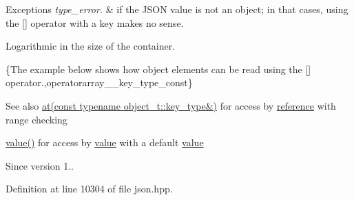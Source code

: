 \begin{DoxyExceptions}{Exceptions}
{\em type\+\_\+error.} & if the J\+S\+ON value is not an object; in that cases, using the \mbox{[}\mbox{]} operator with a key makes no sense.\\
\hline
\end{DoxyExceptions}
Logarithmic in the size of the container.

\{The example below shows how object elements can be read using the {\ttfamily \mbox{[}\mbox{]}} operator.,operatorarray\+\_\+\+\_\+key\+\_\+type\+\_\+const\}

\begin{DoxySeeAlso}{See also}
\hyperlink{classnlohmann_1_1basic__json_a93403e803947b86f4da2d1fb3345cf2c}{at(const typename object\+\_\+t\+::key\+\_\+type\&)} for access by \hyperlink{classnlohmann_1_1basic__json_ac6a5eddd156c776ac75ff54cfe54a5bc}{reference} with range checking 

\hyperlink{classnlohmann_1_1basic__json_a9fa223b26419f018f9b18cc516e3a8e5}{value()} for access by \hyperlink{classnlohmann_1_1basic__json_a9fa223b26419f018f9b18cc516e3a8e5}{value} with a default \hyperlink{classnlohmann_1_1basic__json_a9fa223b26419f018f9b18cc516e3a8e5}{value}
\end{DoxySeeAlso}
\begin{DoxySince}{Since}
version 1.. 
\end{DoxySince}


Definition at line 10304 of file json.\+hpp.


